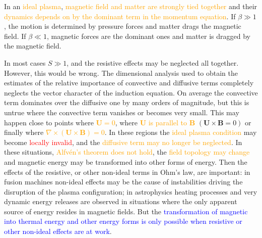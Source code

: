 \documentclass[12pt,a4paper]{article}
\renewcommand{\vec}[1]{\boldsymbol{#1}}
\newcounter{theo}[section]\setcounter{theo}{0}
\begin{document}
In an \textcolor{orange}{ideal plasma}, \textcolor{orange}{magnetic field and matter are strongly tied together} and their \textcolor{orange}{dynamics depends on by the dominant term in the momentum equation}. If $\beta \gg 1$, the motion is determined by pressure forces and matter drags the magnetic field. If $\beta \ll 1$, magnetic forces are the dominant ones and matter is dragged by the magnetic field.

In most cases $S \gg 1$, and the resistive effects may be neglected all together. However, this would be wrong. The dimensional analysis used to obtain the estimates of the relative importance of convective and diffusive terms completely neglects the vector character of the induction equation. On average the convective term dominates over the diffusive one by many orders of magnitude, but this is untrue where the convective term vanishes or becomes very small. This may happen close to points where \textcolor{orange}{$\vec{U} = 0$}, where \textcolor{orange}{$\vec{U}$ is parallel to $\vec{B}$} $(\vec{U}\times \vec{B} = 0)$ or finally where \textcolor{orange}{$\nabla \times (\vec{U}\times \vec{B}) = 0$}. In these regions the \textcolor{orange}{ideal plasma condition} may become \textcolor{red}{locally invalid}, and the \textcolor{orange}{diffusive term may no longer be neglected}. In these situations, \textcolor{orange}{Alfv\'en's theorem does not hold}, the \textcolor{orange}{field topology may change} and magnetic energy may be transformed into other forms of energy. Then the effects of the resistive, or other non-ideal terms in Ohm's law, are important: in fusion machines non-ideal effects may be the cause of instabilities driving the disruption of the plasma configuration; in astrophysics heating processes and very dynamic energy releases are observed in situations where the only apparent source of energy resides in magnetic fields. But the \textcolor{blue}{transformation of magnetic into thermal energy and other energy forms is only possible when resistive or other non-ideal effects are at work}.











\end{document}
